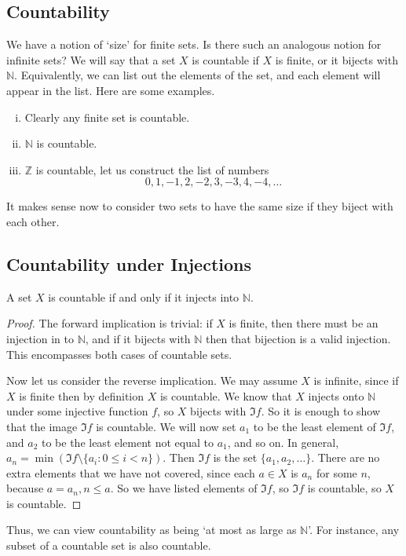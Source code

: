 \subsection{Countability}
We have a notion of `size' for finite sets.
Is there such an analogous notion for infinite sets?
We will say that a set \(X\) is countable if \(X\) is finite, or it bijects with \(\mathbb N\).
Equivalently, we can list out the elements of the set, and each element will appear in the list.
Here are some examples.
\begin{enumerate}[(i)]
	\item Clearly any finite set is countable.
	\item \(\mathbb N\) is countable.
	\item \(\mathbb Z\) is countable, let us construct the list of numbers
	      \[
		      0, 1, -1, 2, -2, 3, -3, 4, -4, \dots
	      \]
\end{enumerate}
It makes sense now to consider two sets to have the same size if they biject with each other.

\subsection{Countability under Injections}
\begin{proposition}
	A set \(X\) is countable if and only if it injects into \(\mathbb N\).
\end{proposition}
\begin{proof}
	The forward implication is trivial: if \(X\) is finite, then there must be an injection in to \(\mathbb N\), and if it bijects with \(\mathbb N\) then that bijection is a valid injection.
	This encompasses both cases of countable sets.
	
	Now let us consider the reverse implication.
	We may assume \(X\) is infinite, since if \(X\) is finite then by definition \(X\) is countable.
	We know that \(X\) injects onto \(\mathbb N\) under some injective function \(f\), so \(X\) bijects with \(\Im f\).
	So it is enough to show that the image \(\Im f\) is countable.
	We will now set \(a_1\) to be the least element of \(\Im f\), and \(a_2\) to be the least element not equal to \(a_1\), and so on.
	In general, \(a_n = \min (\Im f \setminus \{ a_i : 0 \leq i < n \})\).
	Then \(\Im f\) is the set \(\{ a_1, a_2, \dots \}\).
	There are no extra elements that we have not covered, since each \(a \in X\) is \(a_n\) for some \(n\), because \(a=a_n, n \leq a\).
	So we have listed elements of \(\Im f\), so \(\Im f\) is countable, so \(X\) is countable.
\end{proof}
Thus, we can view countability as being `at most as large as \(\mathbb N\)'.
For instance, any subset of a countable set is also countable.

